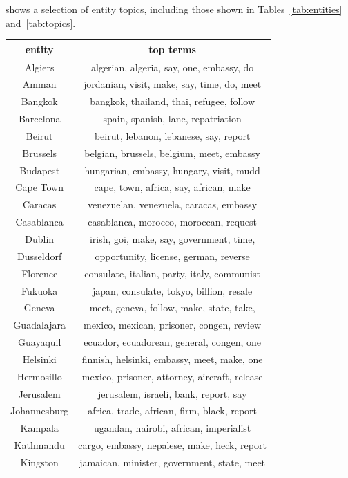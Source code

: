  shows a selection of entity topics, including those shown in Tables~\ref{tab:entities} and~\ref{tab:topics}.

\begin{table}
\centering
\small
\begin{tabular}{cc}
\toprule
entity & top terms \\
\midrule
Algiers & algerian, algeria, say, one, embassy, do \\
Amman & jordanian, visit, make, say, time, do, meet \\
Bangkok & bangkok, thailand, thai, refugee, follow \\
Barcelona & spain, spanish, lane, repatriation \\ 
Beirut & beirut, lebanon, lebanese, say, report \\
Brussels & belgian, brussels, belgium, meet, embassy \\
Budapest & hungarian, embassy, hungary, visit, mudd \\
Cape Town & cape, town, africa, say, african, make \\
Caracas & venezuelan, venezuela, caracas, embassy \\ 
Casablanca & casablanca, morocco, moroccan, request \\
Dublin & irish, goi, make, say, government, time, \\
Dusseldorf & opportunity, license, german, reverse \\ 
Florence & consulate, italian, party, italy, communist \\
Fukuoka & japan, consulate, tokyo, billion, resale \\
Geneva & meet, geneva, follow, make, state, take, \\
Guadalajara & mexico, mexican, prisoner, congen, review \\
Guayaquil & ecuador, ecuadorean, general, congen, one \\
Helsinki & finnish, helsinki, embassy, meet, make, one \\
Hermosillo & mexico, prisoner, attorney, aircraft, release \\
Jerusalem & jerusalem, israeli, bank, report, say \\
Johannesburg & africa, trade, african, firm, black, report \\
Kampala & ugandan, nairobi, african, imperialist \\
Kathmandu & cargo, embassy, nepalese, make, heck, report \\
Kingston & jamaican, minister, government, state, meet \\

\end{tabular}
\end{table}
